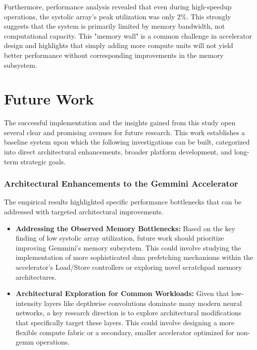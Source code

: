 Furthermore, performance analysis revealed that even during high-speedup operations, the systolic array's peak utilization was only 2\%. This strongly suggests that the system is primarily limited by memory bandwidth, not computational capacity. This "memory wall" is a common challenge in accelerator design and highlights that simply adding more compute units will not yield better performance without corresponding improvements in the memory subsystem.

\section{Future Work}
The successful implementation and the insights gained from this study open several clear and promising avenues for future research. This work establishes a baseline system upon which the following investigations can be built, categorized into direct architectural enhancements, broader platform development, and long-term strategic goals.

\subsubsection{Architectural Enhancements to the Gemmini Accelerator}
The empirical results highlighted specific performance bottlenecks that can be addressed with targeted architectural improvements.
\begin{itemize}
    \item \textbf{Addressing the Observed Memory Bottlenecks:} Based on the key finding of low systolic array utilization, future work should prioritize improving Gemmini's memory subsystem. This could involve studying the implementation of more sophisticated \acrshort{dma} prefetching mechanisms within the accelerator's Load/Store controllers or exploring novel scratchpad memory architectures.

    \item \textbf{Architectural Exploration for Common Workloads:} Given that low-intensity layers like depthwise convolutions dominate many modern neural networks, a key research direction is to explore architectural modifications that specifically target these layers. This could involve designing a more flexible compute fabric or a secondary, smaller accelerator optimized for non-\acrshort{gemm} operations.
\end{itemize}

